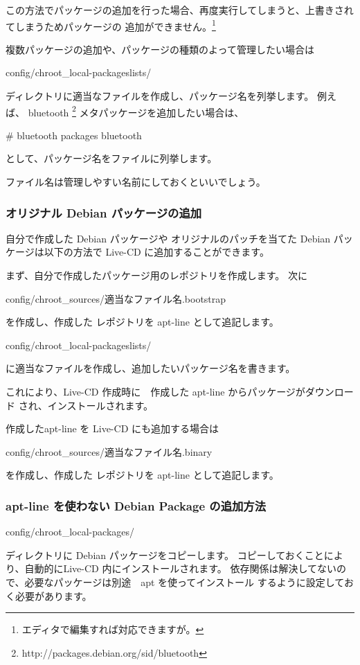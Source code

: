 \documentclass[mingoth,a4paper]{jsarticle}
\begin{document}
この方法でパッケージの追加を行った場合、再度実行してしまうと、上書きされてしまうためパッケージの
追加ができません。\footnote{エディタで編集すれば対応できますが。}

複数パッケージの追加や、パッケージの種類のよって管理したい場合は
\begin{commandline}
config/chroot_local-packageslists/
\end{commandline}
ディレクトリに適当なファイルを作成し、パッケージ名を列挙します。
例えば、 bluetooth
\footnote{http://packages.debian.org/sid/bluetooth} メタパッケージを追加したい場合は、

\begin{commandline}
# bluetooth packages
bluetooth
\end{commandline}
として、パッケージ名をファイルに列挙します。

ファイル名は管理しやすい名前にしておくといいでしょう。

\subsubsection{オリジナル Debian パッケージの追加}

自分で作成した Debian パッケージや オリジナルのパッチを当てた Debian
パッケージは以下の方法で Live-CD に追加することができます。

まず、自分で作成したパッケージ用のレポジトリを作成します。
次に
\begin{commandline}
config/chroot_sources/適当なファイル名.bootstrap
\end{commandline}
を作成し、作成した レポジトリを apt-line として追記します。

\begin{commandline}
config/chroot_local-packageslists/
\end{commandline}
に適当なファイルを作成し、追加したいパッケージ名を書きます。

これにより、Live-CD 作成時に　作成した apt-line からパッケージがダウンロード
され、インストールされます。

作成したapt-line を Live-CD にも追加する場合は
\begin{commandline}
config/chroot_sources/適当なファイル名.binary
\end{commandline}
を作成し、作成した レポジトリを apt-line として追記します。

\subsubsection{apt-line を使わない Debian Package の追加方法}
\begin{commandline}
config/chroot_local-packages/
\end{commandline}
ディレクトリに Debian パッケージをコピーします。
コピーしておくことにより、自動的にLive-CD 内にインストールされます。
依存関係は解決してないので、必要なパッケージは別途　apt を使ってインストール
するように設定しておく必要があります。
\end{document}
